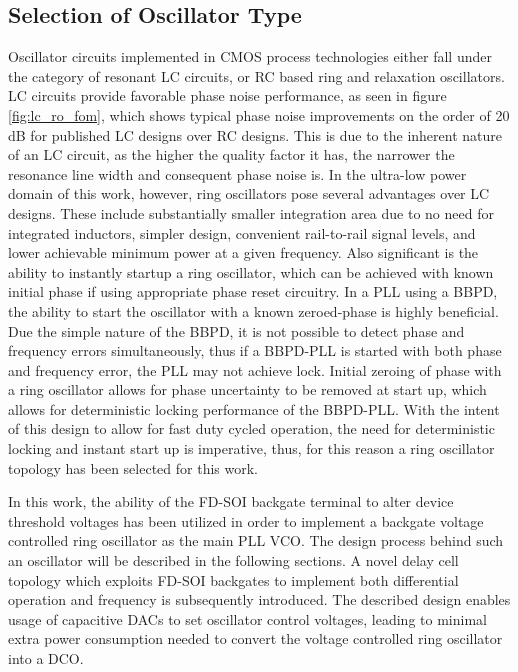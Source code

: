 \subsection{Selection of Oscillator Type}
	Oscillator circuits implemented in CMOS process technologies either fall under the category of resonant LC circuits, or RC based ring and relaxation oscillators. LC circuits provide favorable phase noise performance, as seen in figure \ref{fig:lc_ro_fom}, which shows typical phase noise improvements on the order of 20 dB for published LC designs over RC designs. This is due to the inherent nature of an LC circuit, as the higher the quality factor it has, the narrower the resonance line width and consequent phase noise is. In the ultra-low power domain of this work, however, ring oscillators pose several advantages over LC designs. These include substantially smaller integration area due to no need for integrated inductors, simpler design, convenient rail-to-rail signal levels, and lower achievable minimum power at a given frequency. Also significant is the ability to instantly startup a ring oscillator, which can be achieved with known initial phase if using appropriate phase reset circuitry. In a PLL using a BBPD, the ability to start the oscillator with a known zeroed-phase is highly beneficial. Due the simple nature of the BBPD, it is not possible to detect phase and frequency errors simultaneously, thus if a BBPD-PLL is started with both phase and frequency error, the PLL may not achieve lock. Initial zeroing of phase with a ring oscillator allows for phase uncertainty to be removed at start up, which allows for deterministic locking performance of the BBPD-PLL. With the intent of this design to allow for fast duty cycled operation, the need for deterministic locking and instant start up is imperative, thus, for this reason a ring oscillator topology has been selected for this work. 

	In this work, the ability of the FD-SOI backgate terminal to alter device threshold voltages has been utilized in order to implement a backgate voltage controlled ring oscillator as the main PLL VCO. The design process behind such an oscillator will be described in the following sections. A novel delay cell topology which exploits FD-SOI backgates to implement both differential operation and frequency is subsequently introduced. The described design enables usage of capacitive DACs to set oscillator control voltages, leading to minimal extra power consumption needed to convert the voltage controlled ring oscillator into a DCO.


